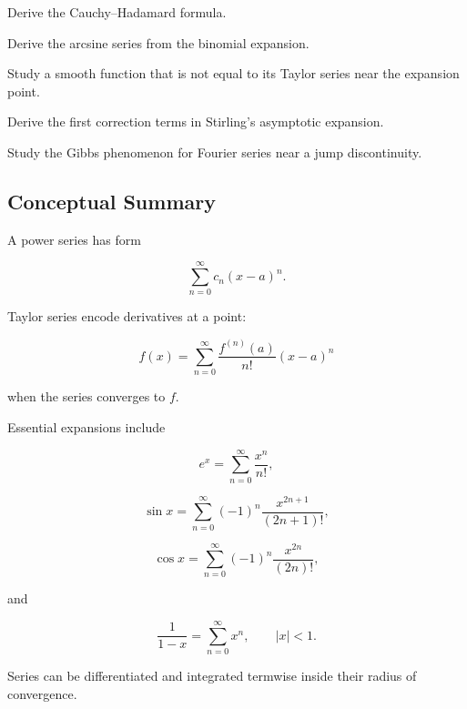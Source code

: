 \begin{exercise}[4]
Derive the Cauchy--Hadamard formula.
\end{exercise}

\begin{exercise}[4]
Derive the arcsine series from the binomial expansion.
\end{exercise}

\begin{exercise}[4]
Study a smooth function that is not equal to its Taylor series near the
expansion point.
\end{exercise}

\begin{exercise}[4]
Derive the first correction terms in Stirling's asymptotic expansion.
\end{exercise}

\begin{exercise}[4]
Study the Gibbs phenomenon for Fourier series near a jump discontinuity.
\end{exercise}

\subsection{Conceptual Summary}
\label{subsec:series-expansions-summary}

A power series has form

\[
\boxed{
\sum_{n=0}^{\infty}
c_n(x-a)^n.
}
\]

Taylor series encode derivatives at a point:

\[
\boxed{
f(x)
=
\sum_{n=0}^{\infty}
\frac{
f^{(n)}(a)
}{
n!
}
(x-a)^n
}
\]

when the series converges to \(f\).

Essential expansions include

\[
\boxed{
e^x
=
\sum_{n=0}^{\infty}
\frac{x^n}{n!},
}
\]

\[
\boxed{
\sin x
=
\sum_{n=0}^{\infty}
(-1)^n
\frac{x^{2n+1}}{(2n+1)!},
}
\]

\[
\boxed{
\cos x
=
\sum_{n=0}^{\infty}
(-1)^n
\frac{x^{2n}}{(2n)!},
}
\]

and

\[
\boxed{
\frac{1}{1-x}
=
\sum_{n=0}^{\infty}x^n,
\qquad
|x|<1.
}
\]

Series can be differentiated and integrated termwise inside their radius of
convergence.

